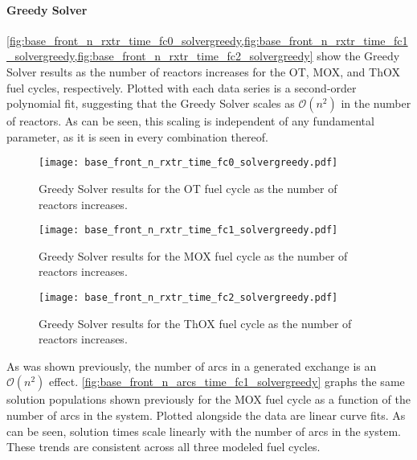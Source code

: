 \paragraph{Greedy Solver}

\cref{fig:base_front_n_rxtr_time_fc0_solvergreedy,fig:base_front_n_rxtr_time_fc1_solvergreedy,fig:base_front_n_rxtr_time_fc2_solvergreedy}
show the Greedy Solver results as the number of reactors increases for the OT,
MOX, and ThOX fuel cycles, respectively. Plotted with each data series is a
second-order polynomial fit, suggesting that the Greedy Solver scales as
$\mathcal{O}(n^2)$ in the number of reactors. As can be seen, this scaling is
independent of any fundamental parameter, as it is seen in every combination
thereof.

\begin{figure}[h!]
  \begin{center}
    \texttt{[image: base\_front\_n\_rxtr\_time\_fc0\_solvergreedy.pdf]}
    \caption[]{
      \label{fig:base_front_n_rxtr_time_fc0_solvergreedy}
      Greedy Solver results for the OT fuel cycle as the number of reactors
      increases.  }
  \end{center}
\end{figure}

\begin{figure}[h!]
  \begin{center}
    \texttt{[image: base\_front\_n\_rxtr\_time\_fc1\_solvergreedy.pdf]}
    \caption[]{
      \label{fig:base_front_n_rxtr_time_fc1_solvergreedy}
      Greedy Solver results for the MOX fuel cycle as the number of reactors
      increases.
    }
  \end{center}
\end{figure}

\begin{figure}[h!]
  \begin{center}
    \texttt{[image: base\_front\_n\_rxtr\_time\_fc2\_solvergreedy.pdf]}
    \caption[]{
      \label{fig:base_front_n_rxtr_time_fc2_solvergreedy}
      Greedy Solver results for the ThOX fuel cycle as the number of reactors
      increases.
      }
  \end{center}
\end{figure}

As was shown previously, the number of arcs in a generated exchange is an
$\mathcal{O}(n^2)$ effect. \ref{fig:base_front_n_arcs_time_fc1_solvergreedy}
graphs the same solution populations shown previously for the MOX fuel cycle as
a function of the number of arcs in the system. Plotted alongside the data are
linear curve fits. As can be seen, solution times scale linearly with the number
of arcs in the system. These trends are consistent across all three modeled fuel
cycles.

